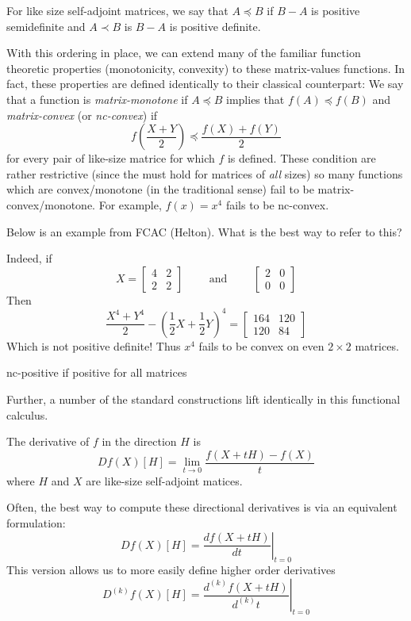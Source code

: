 \begin{definition}
  For like size self-adjoint matrices, we say that \(A \preceq B\) if \(B - A \)
  is positive semidefinite and \(A \prec B\) is \(B-A\) is positive definite.
\end{definition}

With this ordering in place, we can extend many of the familiar function
theoretic properties (monotonicity, convexity) to these matrix-values functions.
In fact, these properties are defined identically to their classical counterpart:
We say that a function is \emph{matrix-monotone} if \(A \preceq B\) implies that
\(f(A) \preceq f(B)\) and \emph{matrix-convex} (or \emph{nc-convex}) if
\[
  f \left( \frac{X+Y}{2} \right) \preceq \frac{f(X)+f(Y)}{2}
\]
for every pair of like-size matrice for which \(f\) is defined. These condition
are rather restrictive (since the must hold for matrices of \emph{all} sizes) so
many functions which are convex/monotone (in the traditional sense) fail to be
matrix-convex/monotone. For example, \(f(x)=x^4\) fails to be nc-convex.
{\color{red} Below is an example from FCAC (Helton). What is the best way to
  refer to this?

Indeed, if
\[
  X = \begin{bmatrix} 4 &2\\2&2 \end{bmatrix}  \qquad \text{ and } \qquad \begin{bmatrix} 2&0\\0&0 \end{bmatrix}
\]
Then
\[
  \frac{X^4+Y^4}{2} - \left( \frac{1}{2}X +\frac{1}{2}Y \right) ^4
  = \begin{bmatrix} 164 &120\\120&84 \end{bmatrix}
\]
Which is not positive definite! Thus \(x^4\) fails to be convex on even
\(2\times 2\) matrices.
}

{\color{blue} nc-positive if positive for all matrices}

Further, a number of the standard constructions lift identically in this
functional calculus.
\begin{definition}
  The derivative of \(f\) in the direction \(H\) is
  \[
    Df(X)[H] = \lim_{t \to 0} \frac{f(X+tH) - f(X)}{t}
  \]
  where \(H\) and \(X\) are like-size self-adjoint matices.
\end{definition}

Often, the best way to compute these directional derivatives is via an
equivalent formulation:
\[
    Df(X)[H] = \left.\frac{df(X+tH)}{dt}\right|_{t=0}
\]
This version allows us to more easily define higher order derivatives
\[
    D^{(k)}f(X)[H] = \left.\frac{d^{(k)}f(X+tH)}{d^{(k)}t}\right|_{t=0}
\]

